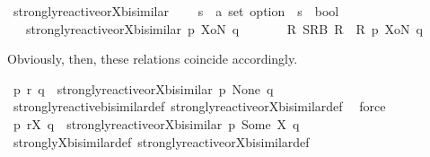 \begin{isabellebody}
\begin{isamarkuptext}
\end{isamarkuptext}\isamarkuptrue%
\isamarkupfalse%
\ strongly{\isacharunderscore}{\kern0pt}reactive{\isacharunderscore}{\kern0pt}or{\isacharunderscore}{\kern0pt}X{\isacharunderscore}{\kern0pt}bisimilar\ \isanewline
\ \ {\isacharcolon}{\kern0pt}{\isacharcolon}{\kern0pt}\ {\isacartoucheopen}{\isacharprime}{\kern0pt}s\ {\isasymRightarrow}\ {\isacharprime}{\kern0pt}a\ set\ option\ {\isasymRightarrow}\ {\isacharprime}{\kern0pt}s\ {\isasymRightarrow}\ bool{\isacartoucheclose}\isanewline
\ \ \ {\isacartoucheopen}strongly{\isacharunderscore}{\kern0pt}reactive{\isacharunderscore}{\kern0pt}or{\isacharunderscore}{\kern0pt}X{\isacharunderscore}{\kern0pt}bisimilar\ p\ XoN\ q\ \isanewline
\ \ \ \ {\isasymequiv}\ {\isasymexists}\ R{\isachardot}{\kern0pt}\ SRB\ R\ {\isasymand}\ R\ p\ XoN\ q{\isacartoucheclose}%
\begin{isamarkuptext}%
Obviously, then, these relations coincide accordingly.%
\end{isamarkuptext}\isamarkuptrue%
\isamarkupfalse%
\ {\isacartoucheopen}p\ {\isasymleftrightarrow}\isactrlsub r\ q\ {\isasymLongleftrightarrow}\ strongly{\isacharunderscore}{\kern0pt}reactive{\isacharunderscore}{\kern0pt}or{\isacharunderscore}{\kern0pt}X{\isacharunderscore}{\kern0pt}bisimilar\ p\ None\ q{\isacartoucheclose}\isanewline
%
\isadelimproof
\ \ %
\endisadelimproof
%
\isatagproof
{}\isamarkupfalse%
\ strongly{\isacharunderscore}{\kern0pt}reactive{\isacharunderscore}{\kern0pt}bisimilar{\isacharunderscore}{\kern0pt}def\ strongly{\isacharunderscore}{\kern0pt}reactive{\isacharunderscore}{\kern0pt}or{\isacharunderscore}{\kern0pt}X{\isacharunderscore}{\kern0pt}bisimilar{\isacharunderscore}{\kern0pt}def\ \isamarkupfalse%
\ force%
\endisatagproof
{\isafoldproof}%
%
\isadelimproof
\isanewline
%
\endisadelimproof
{}\isamarkupfalse%
\ {\isacartoucheopen}p\ {\isasymleftrightarrow}\isactrlsub r\isactrlsup X\ q\ {\isasymLongleftrightarrow}\ strongly{\isacharunderscore}{\kern0pt}reactive{\isacharunderscore}{\kern0pt}or{\isacharunderscore}{\kern0pt}X{\isacharunderscore}{\kern0pt}bisimilar\ p\ {\isacharparenleft}{\kern0pt}Some\ X{\isacharparenright}{\kern0pt}\ q{\isacartoucheclose}\isanewline
%
\isadelimproof
\ \ %
\endisadelimproof
%
\isatagproof
{}\isamarkupfalse%
\ strongly{\isacharunderscore}{\kern0pt}X{\isacharunderscore}{\kern0pt}bisimilar{\isacharunderscore}{\kern0pt}def\ strongly{\isacharunderscore}{\kern0pt}reactive{\isacharunderscore}{\kern0pt}or{\isacharunderscore}{\kern0pt}X{\isacharunderscore}{\kern0pt}bisimilar{\isacharunderscore}{\kern0pt}def\ \isamarkupfalse%

\end{isabellebody}

